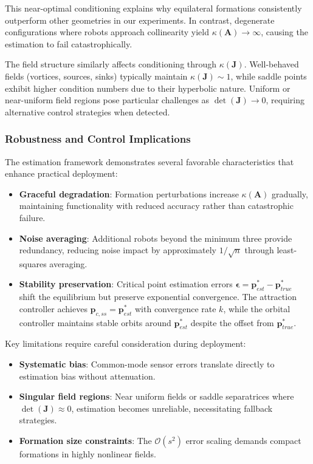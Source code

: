 \documentclass[lettersize,journal]{IEEEtran}
\begin{document}
This near-optimal conditioning explains why equilateral formations consistently outperform other geometries in our experiments. In contrast, degenerate configurations where robots approach collinearity yield $\kappa(\mathbf{A}) \to \infty$, causing the estimation to fail catastrophically.

The field structure similarly affects conditioning through $\kappa(\mathbf{J})$. Well-behaved fields (vortices, sources, sinks) typically maintain $\kappa(\mathbf{J}) \sim 1$, while saddle points exhibit higher condition numbers due to their hyperbolic nature. Uniform or near-uniform field regions pose particular challenges as $\det(\mathbf{J}) \to 0$, requiring alternative control strategies when detected.

\subsubsection{Robustness and Control Implications}

The estimation framework demonstrates several favorable characteristics that enhance practical deployment:

\begin{itemize}
\item \textbf{Graceful degradation}: Formation perturbations increase $\kappa(\mathbf{A})$ gradually, maintaining functionality with reduced accuracy rather than catastrophic failure.
\item \textbf{Noise averaging}: Additional robots beyond the minimum three provide redundancy, reducing noise impact by approximately $1/\sqrt{n}$ through least-squares averaging.
\item \textbf{Stability preservation}: Critical point estimation errors $\boldsymbol{\epsilon} = \mathbf{p}^*_{est} - \mathbf{p}^*_{true}$ shift the equilibrium but preserve exponential convergence. The attraction controller achieves $\mathbf{p}_{c,ss} = \mathbf{p}^*_{est}$ with convergence rate $k$, while the orbital controller maintains stable orbits around $\mathbf{p}^*_{est}$ despite the offset from $\mathbf{p}^*_{true}$.
\end{itemize}

Key limitations require careful consideration during deployment:

\begin{itemize}
\item \textbf{Systematic bias}: Common-mode sensor errors translate directly to estimation bias without attenuation.
\item \textbf{Singular field regions}: Near uniform fields or saddle separatrices where $\det(\mathbf{J}) \approx 0$, estimation becomes unreliable, necessitating fallback strategies.
\item \textbf{Formation size constraints}: The $\mathcal{O}(s^2)$ error scaling demands compact formations in highly nonlinear fields.
\end{itemize}
\end{document}
